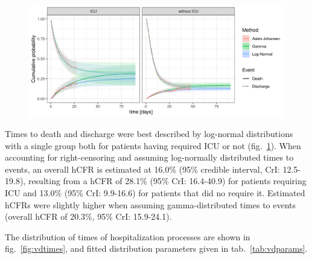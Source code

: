 {\begin{figure}[!htb]
    \includegraphics{fig_covid-switzerland-npi/fig_supp/survival_analaysis.png}
    \label{fig:delays}
\end{figure}


Times to death and discharge were best described by log-normal distributions with a single group both for patients having required ICU or not (fig.~\ref{fig:delays}). When accounting for right-censoring and assuming log-normally distributed times to events, an overall hCFR is estimated at 16.0\% (95\% credible interval, CrI: 12.5-19.8), resulting from a hCFR of 28.1\% (95\% CrI: 16.4-40.9) for patients requiring ICU and 13.0\% (95\% CrI: 9.9-16.6) for patients that did no require it. Estimated hCFRs were slightly higher when assuming gamma-distributed times to events (overall hCFR of 20.3\%, 95\% CrI: 15.9-24.1).


\noindent The distribution of times of hospitalization processes are shown in fig.~\ref{fig:vdtimes}, and fitted distribution parameters given in tab.~\ref{tab:vdparams}.


}
